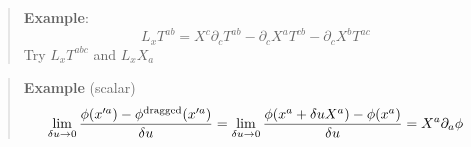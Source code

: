 \begin{quote}
	\textbf{Example}:
\begin{equation}
L_{x}T^{ab} = X^{c}\partial_{c} T^{ab} - \partial_{c} X^{a}T^{cb} - \partial_{c}X^{b}T^{ac}
\end{equation}
Try $L_{x}T^{abc}$ and $L_{x}X_{a}$
\end{quote}

\begin{quote}
	\textbf{Example} (scalar)
\begin{equation}
\lim_{\delta u \to 0} \frac{\phi(x'^{a}) - \phi^{\rm dragged}(x'^{a})}{\delta u} = \lim_{\delta u \to 0} \frac{\phi(x^{a}+\delta u X^{a}) - \phi(x^{a})}{\delta u} = X^{a}\partial_{a}\phi
\end{equation}

\end{quote}
